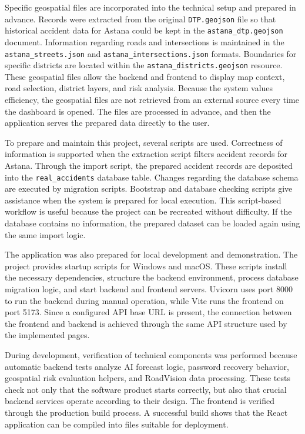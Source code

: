 ﻿\documentclass[12pt,a4paper]{report}
\begin{document}
Specific geospatial files are incorporated into the technical setup and prepared in advance. Records were extracted from the original \texttt{DTP.geojson} file so that historical accident data for Astana could be kept in the \texttt{astana\_dtp.geojson} document. Information regarding roads and intersections is maintained in the \texttt{astana\_streets.json} and \texttt{astana\_intersections.json} formats. Boundaries for specific districts are located within the \texttt{astana\_districts.geojson} resource. These geospatial files allow the backend and frontend to display map context, road selection, district layers, and risk analysis. Because the system values efficiency, the geospatial files are not retrieved from an external source every time the dashboard is opened. The files are processed in advance, and then the application serves the prepared data directly to the user.

To prepare and maintain this project, several scripts are used. Correctness of information is supported when the extraction script filters accident records for Astana. Through the import script, the prepared accident records are deposited into the \texttt{real\_accidents} database table. Changes regarding the database schema are executed by migration scripts. Bootstrap and database checking scripts give assistance when the system is prepared for local execution. This script-based workflow is useful because the project can be recreated without difficulty. If the database contains no information, the prepared dataset can be loaded again using the same import logic.

The application was also prepared for local development and demonstration. The project provides startup scripts for Windows and macOS. These scripts install the necessary dependencies, structure the backend environment, process database migration logic, and start backend and frontend servers. Uvicorn uses port 8000 to run the backend during manual operation, while Vite runs the frontend on port 5173. Since a configured API base URL is present, the connection between the frontend and backend is achieved through the same API structure used by the implemented pages.

During development, verification of technical components was performed because automatic backend tests analyze AI forecast logic, password recovery behavior, geospatial risk evaluation helpers, and RoadVision data processing. These tests check not only that the software product starts correctly, but also that crucial backend services operate according to their design. The frontend is verified through the production build process. A successful build shows that the React application can be compiled into files suitable for deployment.
\end{document}

